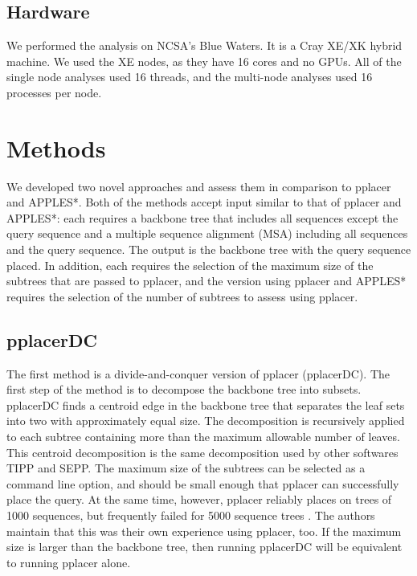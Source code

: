 \documentclass[10pt]{article}
\begin{document}
\subsection{Hardware}

We performed the analysis on NCSA's Blue Waters. It is a Cray XE/XK hybrid machine. We used the XE nodes, as they have 16 cores and no GPUs. All of the single node analyses used 16 threads, and the multi-node analyses used 16 processes per node.

\section{Methods}

We developed two novel approaches and assess them in comparison to pplacer and APPLES*.
Both of the methods accept input similar to that of pplacer and APPLES*:
each requires a backbone tree that includes all sequences except the query sequence and a multiple sequence alignment (MSA) including all sequences and the query sequence.
The output is the backbone tree with the query sequence placed.
In addition, each requires the selection of the maximum size of the subtrees that are passed to pplacer, and the version using pplacer and APPLES* requires the selection of the number of subtrees to assess using pplacer.

\subsection{pplacerDC}

The first method is a divide-and-conquer version of pplacer (pplacerDC).
The first step of the method is to decompose the backbone tree into subsets.
pplacerDC finds a centroid edge in the backbone tree that separates the leaf
sets into two with approximately equal size.
The decomposition is recursively applied to each subtree containing more
than the maximum allowable number of leaves.
This centroid decomposition is the same decomposition used by other softwares TIPP and SEPP\cite{nguyen_tipp_2014}.
The maximum size of the subtrees can be selected as a command line option, and should be small enough that pplacer can successfully place the query.
At the same time, however, 
pplacer reliably places on trees of 1000 sequences, but frequently failed for 5000 sequence trees \cite{balaban_apples_2020}.
The authors maintain that this was their own experience using pplacer, too.
If the maximum size is larger than the backbone tree, then running pplacerDC will be equivalent to running pplacer alone.
\end{document}
